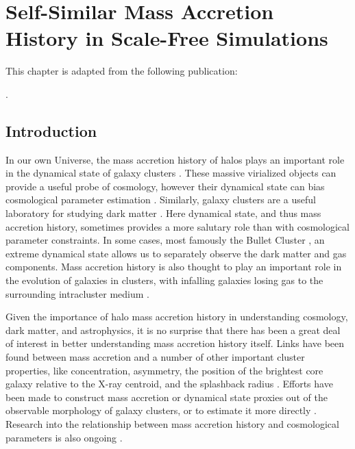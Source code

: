 

\chapter{Self-Similar Mass Accretion History in Scale-Free Simulations} \label{chap:chap-3}



\begin{singlespace}         %
    This chapter is adapted from the following publication:
    
    . 
\end{singlespace} 

\section{Introduction}\label{ch3_introduction}
In our own Universe, the mass accretion history of halos plays an important role in the dynamical state of galaxy clusters \cite[for reviews, see][]{Molnar_2016, Pratt_2019}. These massive virialized objects can provide a useful probe of cosmology, however their dynamical state can bias cosmological parameter estimation \cite[e.g.,][]{Lau_2009, Nelson_2014, Shi_2015, Gianfagna_2021}. Similarly, galaxy clusters are a useful laboratory for studying dark matter \cite[e.g.,][]{Eckert_2022}. Here dynamical state, and thus mass accretion history, sometimes provides a more salutary role than with cosmological parameter constraints. In some cases, most famously the Bullet Cluster \cite{Clowe_2006}, an extreme dynamical state allows us to separately observe the dark matter and gas components. Mass accretion history is also thought to play an important role in the evolution of galaxies in clusters, with infalling galaxies losing gas to the surrounding intracluster medium \cite[for a review, see][]{Boselli_2022}.

Given the importance of halo mass accretion history in understanding cosmology, dark matter, and astrophysics, it is no surprise that there has been a great deal of interest in better understanding mass accretion history itself. Links have been found between mass accretion and a number of other important cluster properties, like concentration, asymmetry, the position of the brightest core galaxy relative to the X-ray centroid, and the splashback radius \cite[e.g.,][]{Lovisari_2017, Dupourque_2022, Shin_2023}. Efforts have been made to construct mass accretion or dynamical state proxies out of the observable morphology of galaxy clusters, or to estimate it more directly \cite{De_Luca_2021, Capalbo_2022, Perez_2023, Pizzardo_2023, Arendt_2024, Soltis_2025}. Research into the relationship between mass accretion history and cosmological parameters is also ongoing \cite[Warburton et al. in prep.;][]{Amoura_2024}.

